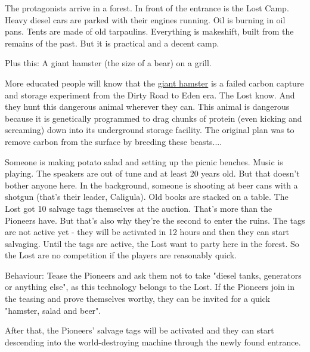 The protagonists arrive in a forest. In front of the entrance is the Lost Camp. Heavy diesel cars are parked with their engines running. Oil is burning in oil pans. Tents are made of old tarpaulins. Everything is makeshift, built from the remains of the past. But it is practical and a decent camp.

Plus this: A giant hamster (the size of a bear) on a grill.

\begin{sidebarBox}[title=Failed CCS experiment: Hamster]
More educated people will know that the \hyperref[sec:Giant Hamster]{giant hamster} is a failed carbon capture and storage experiment from the Dirty Road to Eden era. The Lost know. And they hunt this dangerous animal wherever they can. This animal is dangerous because it is genetically programmed to drag chunks of protein (even kicking and screaming) down into its underground storage facility. The original plan was to remove carbon from the surface by breeding these beasts....
\end{sidebarBox}

Someone is making potato salad and setting up the picnic benches. Music is playing.
The speakers are out of tune and at least 20 years old. But that doesn't bother anyone here. In the background, someone is shooting at beer cans with a shotgun (that's their leader, Caligula). Old books are stacked on a table.
The Lost got 10 salvage tags themselves at the auction. That's more than the Pioneers have. But that's also why they're the second to enter the ruins. The tags are not active yet - they will be activated in 12 hours and then they can start salvaging. Until the tags are active, the Lost want to party
here in the forest. So the Lost are no competition if the players are reasonably quick.

Behaviour: Tease the Pioneers and ask them not to take "diesel tanks, generators or anything else", as this technology belongs to the Lost. If the Pioneers join in the teasing and prove themselves worthy, they can be invited for a quick "hamster, salad and beer".

After that, the Pioneers' salvage tags will be activated and they can start descending into the world-destroying machine through the newly found entrance.

